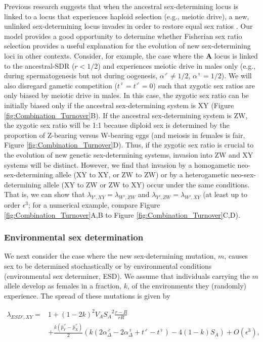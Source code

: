\documentclass[12pt]{article}
\begin{document}
Previous research suggests that when the ancestral sex-determining locus is linked to a locus that experiences haploid selection (e.g., meiotic drive), a new, unlinked sex-determining locus invades in order to restore equal sex ratios \citep{Kozielska:2010vm}. 
Our model provides a good opportunity to determine whether Fisherian sex ratio selection provides a useful explanation for the evolution of new sex-determining loci in other contexts. 
Consider, for example, the case where the \textbf{A} locus is linked to the ancestral-SDR ($r<1/2$) and experiences meiotic drive in males only (e.g., during spermatogenesis but not during oogenesis, $\alpha^\male \neq 1/2$, $\alpha^\female=1/2$). 
We will also disregard gametic competition ($t^\female=t^\male=0$) such that zygotic sex ratios are only biased by meiotic drive in males. 
In this case, the zygotic sex ratio can be initially biased only if the ancestral sex-determining system is XY (Figure \ref{fig:Combination_Turnover}B). 
If the ancestral sex-determining system is ZW, the zygotic sex ratio will be 1:1 because diploid sex is determined by the proportion of Z-bearing versus W-bearing eggs (and meiosis in females is fair, Figure \ref{fig:Combination_Turnover}D).
Thus, if the zygotic sex ratio is crucial to the evolution of new genetic sex-determining systems, invasion into ZW and XY systems will be distinct. 
However, we find that invasion by a homogametic neo-sex-determining allele (XY to XY, or ZW to ZW) or by a heterogametic neo-sex-determining allele (XY to ZW or ZW to XY) occur under the same conditions. 
That is, we can show that $\lambda_{Y',XY}=\lambda_{W',ZW}$ and $\lambda_{Y',ZW}=\lambda_{W',XY}$ (at least up to order $\epsilon^3$; for a numerical example, compare Figure \ref{fig:Combination_Turnover}A,B to Figure \ref{fig:Combination_Turnover}C,D).

\subsubsection*{Environmental sex determination}

We next consider the case where the new sex-determining mutation, $m$, causes sex to be determined stochastically or by environmental conditions (environmental sex determiner, ESD). 
We assume that individuals carrying the $m$ allele develop as females in a fraction, $k$, of the environments they (randomly) experience. 
The spread of these mutations is given by 

\begin{equation}
\begin{split}
\lambda_{ESD',XY} =& 1 + (1-2k)^2V_{A}{S_{A}}^2\frac{r-R}{r R} \\
&+\frac{k(\hat{p}^\male_Y-\hat{p}^\male_X)}{2}\left(k\left(2\alpha_{\Delta}^\male-2\alpha_{\Delta}^\female+t^\male-t^\female \right) -4(1-k)S_{A}\right)+O\left(\epsilon^3\right),
\end{split}
\label{eq:lambda_ESD_k}
\end{equation}
\end{document}
